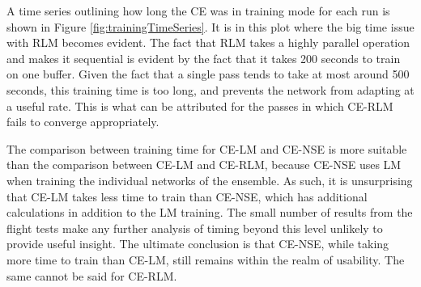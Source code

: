 \clearpage
\par A time series outlining how long the CE was in training mode for each run is shown in Figure \ref{fig:trainingTimeSeries}. It is in this plot where the big time issue with RLM becomes evident. The fact that RLM takes a highly parallel operation and makes it sequential is evident by the fact that it takes 200 seconds to train on one buffer. Given the fact that a single pass tends to take at most around 500 seconds, this training time is too long, and prevents the network from adapting at a useful rate. This is what can be attributed for the passes in which CE-RLM fails to converge appropriately.
\par The comparison between training time for CE-LM and CE-NSE is more suitable than the comparison between CE-LM and CE-RLM, because CE-NSE uses LM when training the individual networks of the ensemble. As such, it is unsurprising that CE-LM takes less time to train than CE-NSE, which has additional calculations in addition to the LM training. The small number of results from the flight tests make any further analysis of timing beyond this level unlikely to provide useful insight. The ultimate conclusion is that CE-NSE, while taking more time to train than CE-LM, still remains within the realm of usability. The same cannot be said for CE-RLM. 

